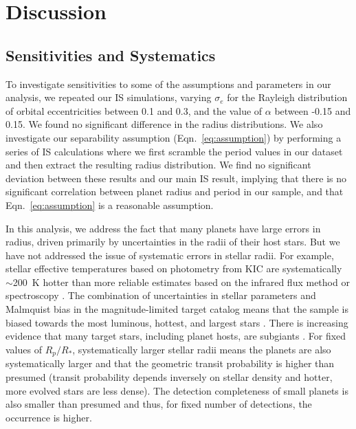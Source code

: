 
\section{Discussion}
\label{sec:discussion}

\subsection{Sensitivities and Systematics}
\label{sec:sensitivity}

To investigate sensitivities to some of the assumptions and parameters
in our analysis, we repeated our IS simulations, varying $\sigma_e$
for the Rayleigh distribution of orbital eccentricities between 0.1
and 0.3, and the value of $\alpha$ between -0.15 and 0.15.  We found
no significant difference in the radius distributions. We also
investigate our separability assumption (Eqn.~\ref{eq:assumption}) by
performing a series of IS calculations where we first scramble the
period values in our dataset and then extract the resulting radius
distribution. We find no significant deviation between these results
and our main IS result, implying that there is no significant
correlation between planet radius and period in our sample, and
that Eqn.~\ref{eq:assumption} is a reasonable assumption.

In this analysis, we address the fact that many \kep{} planets
have large errors in radius, driven primarily
by uncertainties in the radii of their host stars.
But we have not addressed the issue of systematic errors
in stellar radii.  For example,
stellar effective temperatures based on photometry from KIC
\citep{Brown2011} are systematically $\sim$200~K hotter than more
reliable estimates based on the infrared flux method
\citep{Pinsonneault2012} or spectroscopy \citep{Gaidos2013}.  The
combination of uncertainties in stellar parameters and Malmquist bias
in the magnitude-limited \kep{} target catalog means that the
sample is biased towards the most luminous, hottest, and largest stars
\citep{GaidosMann2013}.  There is increasing evidence that many \kep{}
target stars, including planet hosts, are subgiants \citep[e.g.,
][]{Verner2011,Everett2013,Bastien2014}.  For fixed values of
$R_p/R_*$, systematically larger stellar radii means the planets
are also systematically larger and that the geometric transit
probability is higher than presumed (transit probability depends
inversely on stellar density and hotter, more evolved stars are less
dense).  The detection completeness of small planets is also smaller
than presumed and thus, for fixed number of detections, the occurrence
is higher.

